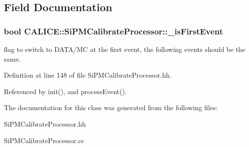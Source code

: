 \subsection{Field Documentation}
\subsubsection[{\-\_\-is\-First\-Event}]{\setlength{\rightskip}{0pt plus 5cm}bool C\-A\-L\-I\-C\-E\-::\-Si\-P\-M\-Calibrate\-Processor\-::\-\_\-is\-First\-Event\hspace{0.3cm}{\ttfamily [protected]}}\label{classCALICE_1_1SiPMCalibrateProcessor_a33046a6aada7df9b6a5c369d852c6c23}


flag to switch to D\-A\-T\-A/\-M\-C at the first event, the following events should be the same. 



Definition at line 148 of file Si\-P\-M\-Calibrate\-Processor.\-hh.



Referenced by init(), and process\-Event().



The documentation for this class was generated from the following files\-:\begin{DoxyCompactItemize}
\item 
Si\-P\-M\-Calibrate\-Processor.\-hh\item 
Si\-P\-M\-Calibrate\-Processor.\-cc\end{DoxyCompactItemize}
